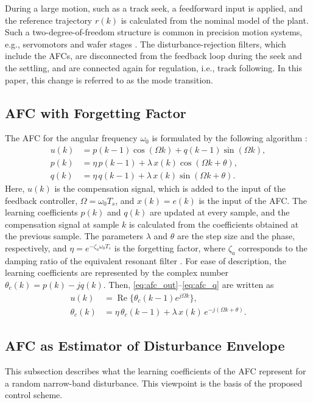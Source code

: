 \documentclass[conference]{IEEEtran}
\newcommand{\Ts}{T_s}
\newcommand{\thc}{\theta_c}              %
\newcommand{\re}{\operatorname{Re}}
\begin{document}
During a large motion, such as a track seek, a feedforward input is applied,
and the reference trajectory $r(k)$ is calculated from the nominal model of the
plant. Such a two-degree-of-freedom structure is common in precision motion
systems, e.g., servomotors and wafer stages
\cite{fujimoto2001,lambrechts2005,oomen2018}. The disturbance-rejection
filters, which include the AFCs, are disconnected from the feedback loop during
the seek and the settling, and are connected again for regulation, i.e., track
following. In this paper, this change is referred to as the mode transition.

\subsection{AFC with Forgetting Factor}
The AFC for the angular frequency $\omega_0$ is formulated by the following
algorithm \cite{yabui2013}:
\begin{align}
u(k) &= p(k-1)\cos(\Omega k) + q(k-1)\sin(\Omega k), \label{eq:afc_out}\\
p(k) &= \eta\, p(k-1) + \lambda\, x(k)\cos(\Omega k + \theta), \label{eq:afc_p}\\
q(k) &= \eta\, q(k-1) + \lambda\, x(k)\sin(\Omega k + \theta). \label{eq:afc_q}
\end{align}
Here, $u(k)$ is the compensation signal, which is added to the input of the
feedback controller, $\Omega = \omega_0 \Ts$, and $x(k) = e(k)$ is the input
of the AFC. The learning coefficients
$p(k)$ and $q(k)$ are updated at every sample, and the compensation signal at
sample $k$ is calculated from the coefficients obtained at the previous
sample. The parameters $\lambda$ and $\theta$ are the step size and the phase,
respectively, and $\eta = e^{-\zeta_a \omega_0 \Ts}$ is the forgetting factor,
where $\zeta_a$ corresponds to the damping ratio of the equivalent resonant
filter \cite{messner1995,yabui2013}. For ease of description, the learning
coefficients are represented by the complex number $\thc(k) = p(k) - jq(k)$.
Then, \eqref{eq:afc_out}--\eqref{eq:afc_q} are written as
\begin{align}
u(k) &= \re\{\thc(k-1) e^{j\Omega k}\}, \label{eq:afc_cout}\\
\thc(k) &= \eta\,\thc(k-1) + \lambda\, x(k)\, e^{-j(\Omega k + \theta)}.
\label{eq:afc_update}
\end{align}

\subsection{AFC as Estimator of Disturbance Envelope}
This subsection describes what the learning coefficients of the AFC represent
for a random narrow-band disturbance. This viewpoint is the basis of the
proposed control scheme.
\end{document}
